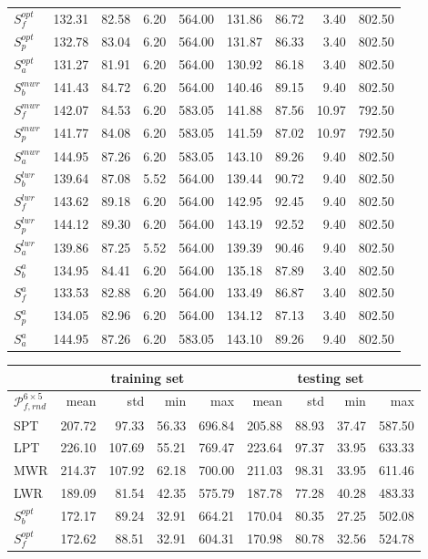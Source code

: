 {\begin{table}
{\begin{tabular}{|l|rrrr|rrrr|}
$S^{opt}_f$ &132.31&82.58&6.20&564.00&131.86&86.72&3.40&802.50\\
$S^{opt}_p$ &132.78&83.04&6.20&564.00&131.87&86.33&3.40&802.50\\
$S^{opt}_a$ &131.27&81.91&6.20&564.00&130.92&86.18&3.40&802.50\\
$S^{mwr}_b$ &141.43&84.72&6.20&564.00&140.46&89.15&9.40&802.50\\
$S^{mwr}_f$ &142.07&84.53&6.20&583.05&141.88&87.56&10.97&792.50\\
$S^{mwr}_p$ &141.77&84.08&6.20&583.05&141.59&87.02&10.97&792.50\\
$S^{mwr}_a$ &144.95&87.26&6.20&583.05&143.10&89.26&9.40&802.50\\
$S^{lwr}_b$ &139.64&87.08&5.52&564.00&139.44&90.72&9.40&802.50\\
$S^{lwr}_f$ &143.62&89.18&6.20&564.00&142.95&92.45&9.40&802.50\\
$S^{lwr}_p$ &144.12&89.30&6.20&564.00&143.19&92.52&9.40&802.50\\
$S^{lwr}_a$ &139.86&87.25&5.52&564.00&139.39&90.46&9.40&802.50\\
$S^{a}_b$ &134.95&84.41&6.20&564.00&135.18&87.89&3.40&802.50\\
$S^{a}_f$ &133.53&82.88&6.20&564.00&133.49&86.87&3.40&802.50\\
$S^{a}_p$ &134.05&82.96&6.20&564.00&134.12&87.13&3.40&802.50\\
$S^{a}_a$ &144.95&87.26&6.20&583.05&143.10&89.26&9.40&802.50\\
\hline
\end{tabular}}
\end{table}
\begin{table}{\tiny
\begin{tabular}{|l|rrrr|rrrr|} \hline 
& \multicolumn{4}{c|}{training set}& \multicolumn{4}{c|}{testing set} \\
\hline
$\mathcal{P}^{6\times5}_{f,rnd}$ & mean & std & min & max & mean & std & min & max \\
\hline
SPT &207.72&97.33&56.33&696.84&205.88&88.93&37.47&587.50\\
LPT &226.10&107.69&55.21&769.47&223.64&97.37&33.95&633.33\\
MWR &214.37&107.92&62.18&700.00&211.03&98.31&33.95&611.46\\
LWR &189.09&81.54&42.35&575.79&187.78&77.28&40.28&483.33\\
$S^{opt}_b$ &172.17&89.24&32.91&664.21&170.04&80.35&27.25&502.08\\
$S^{opt}_f$ &172.62&88.51&32.91&604.31&170.98&80.78&32.56&524.78\\

\end{tabular}}
\end{table}}
